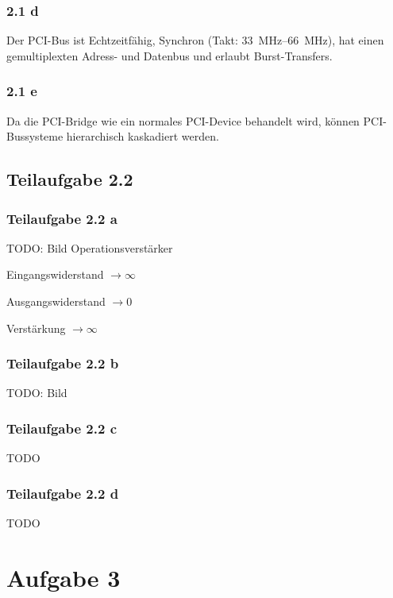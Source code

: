 \documentclass[a4paper]{scrartcl}
\begin{document}
  \subsubsection*{2.1 d}
  Der PCI-Bus ist Echtzeitfähig,
  Synchron (Takt: \SIrange[range-phrase = --]{33}{66}{\mega\hertz}),
  hat einen gemultiplexten Adress- und Datenbus und erlaubt Burst-Transfers.

  \subsubsection*{2.1 e}
  Da die PCI-Bridge wie ein normales PCI-Device behandelt wird, können
  PCI-Bussysteme hierarchisch kaskadiert werden.

  \subsection*{Teilaufgabe 2.2}
  \subsubsection*{Teilaufgabe 2.2 a}
  TODO: Bild Operationsverstärker

  \begin{enumerate*}[label=(\roman*)]
      \item Eingangswiderstand $\rightarrow \infty$
      \item Ausgangswiderstand $\rightarrow 0$
      \item Verstärkung $\rightarrow \infty$
  \end{enumerate*}

  \subsubsection*{Teilaufgabe 2.2 b}
  TODO: Bild

  \subsubsection*{Teilaufgabe 2.2 c}
  TODO

  \subsubsection*{Teilaufgabe 2.2 d}
  TODO

  \section*{Aufgabe 3}
\end{document}
